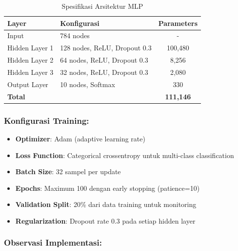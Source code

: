 \documentclass[12pt,a4paper]{article}
\begin{document}
\begin{table}[H]
\centering
\caption{Spesifikasi Arsitektur MLP}
\begin{tabular}{|l|l|c|}
\hline
\textbf{Layer} & \textbf{Konfigurasi} & \textbf{Parameters} \\
\hline
Input & 784 nodes & - \\
Hidden Layer 1 & 128 nodes, ReLU, Dropout 0.3 & 100,480 \\
Hidden Layer 2 & 64 nodes, ReLU, Dropout 0.3 & 8,256 \\
Hidden Layer 3 & 32 nodes, ReLU, Dropout 0.3 & 2,080 \\
Output Layer & 10 nodes, Softmax & 330 \\
\hline
\textbf{Total} & & \textbf{111,146} \\
\hline
\end{tabular}
\end{table}

\subsubsection{Konfigurasi Training:}

\begin{itemize}
    \item \textbf{Optimizer}: Adam (adaptive learning rate)
    \item \textbf{Loss Function}: Categorical crossentropy untuk multi-class classification
    \item \textbf{Batch Size}: 32 sampel per update
    \item \textbf{Epochs}: Maximum 100 dengan early stopping (patience=10)
    \item \textbf{Validation Split}: 20\% dari data training untuk monitoring
    \item \textbf{Regularization}: Dropout rate 0.3 pada setiap hidden layer
\end{itemize}

\subsubsection{Observasi Implementasi:}
\end{document}
